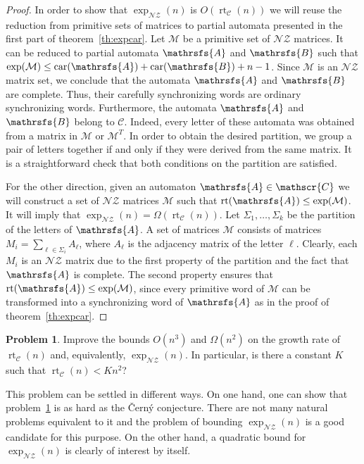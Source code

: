 \documentclass[a4paper,USenglish]{lipics}
\DeclareMathOperator{\rt}{rt}
\DeclareMathOperator{\car}{car}
\theoremstyle{definition}
\newtheorem{problem}[theorem]{Problem}
\begin{document}
\begin{proof}
In order to show that $\exp_{\mathscr{NZ}}(n)$ is $O(\rt_{\mathscr{C}}(n))$ we will reuse the reduction from primitive sets of matrices to partial automata presented in the first part of theorem~\ref{th:expcar}. Let $\mathcal{M}$ be a primitive set of $\mathscr{NZ}$ matrices. It can be reduced to partial automata $\mathrsfs{A}$ and $\mathrsfs{B}$ such that $\exp(\mathcal{M}) \leq \car(\mathrsfs{A}) + \car(\mathrsfs{B}) + n-1$. Since $\mathcal{M}$ is an $\mathscr{NZ}$ matrix set, we conclude that the automata $\mathrsfs{A}$ and $\mathrsfs{B}$ are complete. Thus, their carefully synchronizing words are ordinary synchronizing words. Furthermore, the automata $\mathrsfs{A}$ and $\mathrsfs{B}$ belong to $\mathscr{C}$. Indeed, every letter of these automata was obtained from a matrix in $\mathcal{M}$ or $\mathcal{M}^T$. In order to obtain the desired partition, we group a pair of letters together if and only if they were derived from the same matrix. It is a straightforward check that both conditions on the partition are satisfied.

For the other direction, given an automaton $\mathrsfs{A} \in \mathscr{C}$ we will construct a set of $\mathscr{NZ}$ matrices $\mathcal{M}$ such that $\rt(\mathrsfs{A}) \leq \exp(\mathcal{M})$. It will imply that $\exp_{\mathscr{NZ}}(n)=\Omega(\rt_{\mathscr{C}}(n))$. Let $\Sigma_1, \ldots, \Sigma_k$ be the partition of the letters of $\mathrsfs{A}$. A set of matrices $\mathcal{M}$ consists of matrices $M_i = \sum_{\ell \in \Sigma_i} A_\ell$, where $A_\ell$ is the adjacency matrix of the letter $\ell$. Clearly, each $M_i$ is an $\mathscr{NZ}$ matrix due to the first property of the partition and the fact that $\mathrsfs{A}$ is complete. The second property ensures that $\rt(\mathrsfs{A}) \leq \exp(\mathcal{M})$, since every primitive word of $\mathcal{M}$ can be transformed into a synchronizing word of $\mathrsfs{A}$ as in the proof of theorem~\ref{th:expcar}.
\end{proof}

\begin{problem}
\label{prob:rtnzrc}
Improve the bounds $O(n^3)$ and $\Omega(n^2)$ on the growth rate of $\rt_{\mathscr{C}}(n)$ and, equivalently, $\exp_{\mathscr{NZ}}(n)$. In particular, is there a constant $K$ such that $\rt_{\mathscr{C}}(n) < K n^2$?
\end{problem}
This problem can be settled in different ways. On one hand, one can show that problem~\ref{prob:rtnzrc} is as hard as the \v{C}ern\'{y} conjecture. There are not many natural problems equivalent to it and the problem of bounding $\exp_{\mathscr{NZ}}(n)$ is a good candidate for this purpose. On the other hand, a quadratic bound for $\exp_{\mathscr{NZ}}(n)$ is clearly of interest by itself.
\end{document}

